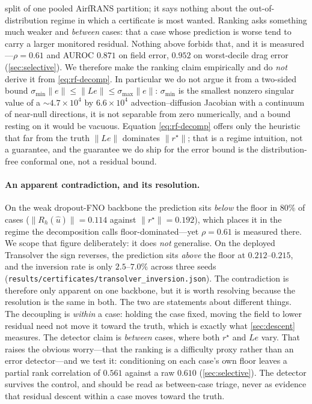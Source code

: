 split of one pooled AirfRANS partition; it says nothing about the out-of-distribution
regime in which a certificate is most wanted. Ranking asks something much
weaker and \emph{between} cases: that a case whose prediction is worse tend to carry a
larger monitored residual. Nothing above forbids that, and it is measured---$\rho=0.61$
and AUROC $0.871$ on field error, $0.952$ on worst-decile drag error
(\autoref{sec:selective}). We therefore make the ranking claim empirically and do
\emph{not} derive it from \eqref{eq:rf-decomp}. In particular we do not argue it from a
two-sided bound $\sigma_{\min}\|e\|\le\|Le\|\le\sigma_{\max}\|e\|$: $\sigma_{\min}$ is the
smallest nonzero singular value of a $\sim\!4.7\times10^4$ by $6.6\times10^4$
advection--diffusion Jacobian with a continuum of near-null directions, it is not
separable from zero numerically, and a bound resting on it would be vacuous. Equation
\eqref{eq:rf-decomp} offers only the heuristic that far from the truth $\|Le\|$ dominates
$\|r^\star\|$; that is a regime intuition, not a guarantee, and the guarantee we do ship
for the error bound is the distribution-free conformal one, not a residual bound.

\paragraph{An apparent contradiction, and its resolution.} On the weak dropout-FNO
backbone the prediction sits \emph{below} the floor in $80\%$ of cases
($\|R_h(\hat u)\|=0.114$ against $\|r^\star\|=0.192$), which places it in the regime the
decomposition calls floor-dominated---yet $\rho=0.61$ is measured there. We scope that
figure deliberately: it does \emph{not} generalise. On the deployed Transolver the sign
reverses, the prediction sits \emph{above} the floor at $0.212$--$0.215$, and the
inversion rate is only $2.5$--$7.0\%$ across three seeds
(\texttt{results/certificates/transolver\_inversion.json}). The contradiction is therefore
only apparent on one backbone, but it is worth resolving because the resolution is the
same in both. The two are statements about
different things. The decoupling is \emph{within} a case: holding the case fixed, moving
the field to lower residual need not move it toward the truth, which is exactly what
\autoref{sec:descent} measures. The detector claim is \emph{between} cases, where both
$r^\star$ and $Le$ vary. That raises the obvious worry---that the ranking is a difficulty
proxy rather than an error detector---and we test it: conditioning on each case's own floor
leaves a partial rank correlation of $0.561$ against a raw $0.610$
(\autoref{sec:selective}). The detector survives the control, and should be read as
between-case triage, never as evidence that residual descent within a case moves toward the
truth.

